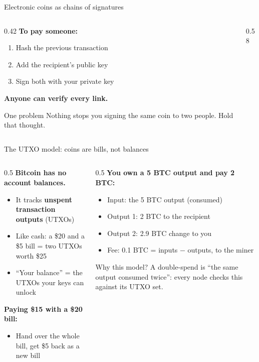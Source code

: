 \ifdefined\PRESENTATION\else\PassOptionsToClass{handout}{beamer}\fi\documentclass[aspectratio=169, lualatex]{beamer}
\begin{document}
\begin{frame}{Electronic coins as chains of signatures}
	\begin{columns}[c]
		\begin{column}{0.42\textwidth}
			\textbf{To pay someone:}
			\begin{enumerate}
				\item Hash the previous transaction
				\item Add the recipient's public key
				\item Sign both with your private key
			\end{enumerate}
			\textbf{Anyone can verify every link.}
			\begin{alertblock}{One problem}
				Nothing stops you signing the same coin to two people. Hold that thought.
			\end{alertblock}
		\end{column}
		\begin{column}{0.58\textwidth}
		\end{column}
	\end{columns}
\end{frame}

\begin{frame}{The UTXO model: coins are bills, not balances}
	\begin{columns}[c]
		\begin{column}{0.5\textwidth}
			\textbf{Bitcoin has no account balances.}
			\begin{itemize}
				\item It tracks \textbf{unspent transaction outputs} (UTXOs)
				\item Like cash: a \$20 and a \$5 bill = two UTXOs worth \$25
				\item ``Your balance'' = the UTXOs your keys can unlock
			\end{itemize}
			\textbf{Paying \$15 with a \$20 bill:}
			\begin{itemize}
				\item Hand over the whole bill, get \$5 back as a new bill
			\end{itemize}
		\end{column}
		\begin{column}{0.5\textwidth}
			\textbf{You own a 5 BTC output and pay 2 BTC:}
			\begin{itemize}
				\item Input: the 5 BTC output (consumed)
				\item Output 1: 2 BTC to the recipient
				\item Output 2: 2.9 BTC change to you
				\item Fee: 0.1 BTC = inputs $-$ outputs, to the miner
			\end{itemize}
			\begin{exampleblock}{Why this model?}
				A double-spend is ``the same output consumed twice'': every node checks this against its UTXO set.
			\end{exampleblock}
		\end{column}
	\end{columns}
\end{frame}
\end{document}

